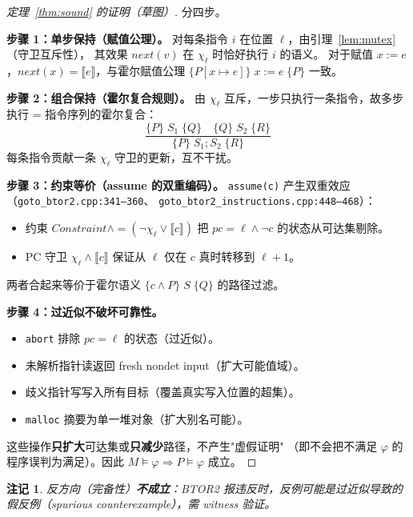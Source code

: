 \documentclass[11pt,a4paper]{article}
\newtheorem{remark}{注记}[section]
\newcommand{\Cons}{\mathit{Constraint}}
\newcommand{\eval}[1]{\llbracket #1 \rrbracket}
\newcommand{\guard}{\chi}
\newcommand{\nextv}[1]{\mathit{next}(#1)}
\begin{document}
\begin{proof}[定理~\ref{thm:sound} 的证明（草图）]
  分四步。

  \medskip\noindent\textbf{步骤 1：单步保持（赋值公理）。}
  对每条指令 $i$ 在位置 $\ell$，由引理~\ref{lem:mutex}（守卫互斥性），
  其效果 $\nextv{v}$ 在 $\guard_\ell$ 时恰好执行 $i$ 的语义。
  对于赋值 $x := e$，$\nextv{x} = \eval{e}$，与霍尔赋值公理
  $\{P[x \mapsto e]\}\;x{:=}e\;\{P\}$ 一致。

  \medskip\noindent\textbf{步骤 2：组合保持（霍尔复合规则）。}
  由 $\guard_\ell$ 互斥，一步只执行一条指令，故多步执行 = 指令序列的霍尔复合：
  \[
    \frac{\{P\}\;S_1\;\{Q\} \quad \{Q\}\;S_2\;\{R\}}
         {\{P\}\;S_1;S_2\;\{R\}}
  \]
  每条指令贡献一条 $\guard_\ell$ 守卫的更新，互不干扰。

  \medskip\noindent\textbf{步骤 3：约束等价（assume 的双重编码）。}
  \texttt{assume(c)} 产生双重效应（\texttt{goto\_btor2.cpp:341--360}、
  \texttt{goto\_btor2\_instructions.cpp:448--468}）：
  \begin{itemize}
    \item 约束 $\Cons \wedge= (\neg\guard_\ell \vee \eval{c})$ 把
          $\mathit{pc}=\ell \wedge \neg c$ 的状态从可达集剔除。
    \item PC 守卫 $\guard_\ell \wedge \eval{c}$ 保证从 $\ell$ 仅在 $c$ 真时转移到 $\ell{+}1$。
  \end{itemize}
  两者合起来等价于霍尔语义 $\{c \wedge P\}\;S\;\{Q\}$ 的路径过滤。

  \medskip\noindent\textbf{步骤 4：过近似不破坏可靠性。}
  \begin{itemize}
    \item \texttt{abort} 排除 $\mathit{pc}=\ell$ 的状态（过近似）。
    \item 未解析指针读返回 fresh nondet input（扩大可能值域）。
    \item 歧义指针写写入所有目标（覆盖真实写入位置的超集）。
    \item \texttt{malloc} 摘要为单一堆对象（扩大别名可能）。
  \end{itemize}
  这些操作\textbf{只扩大}可达集或\textbf{只减少}路径，不产生"虚假证明"
  （即不会把不满足 $\varphi$ 的程序误判为满足）。因此
  $M \models \varphi \Rightarrow P \models \varphi$ 成立。
\end{proof}

\begin{remark}
  反方向（完备性）\textbf{不成立}：BTOR2 报违反时，反例可能是过近似导致的
  \emph{假反例}（spurious counterexample），需 witness 验证。
\end{remark}
\end{document}
